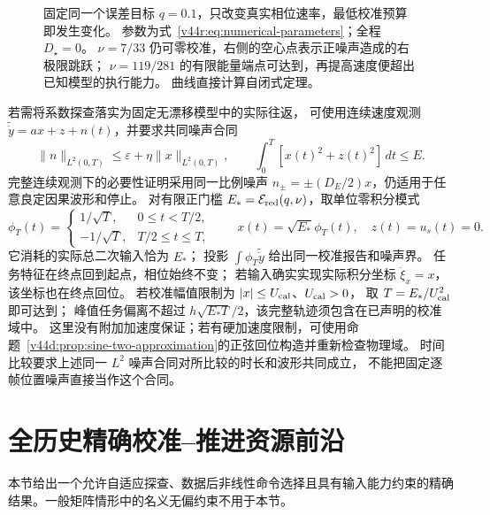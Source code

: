 \documentclass[11pt,a4paper]{article}
\numberwithin{equation}{section}
\theoremstyle{definition}
\begin{document}
\begin{figure}[htbp]
\caption{固定同一个误差目标 $q=0.1$，只改变真实相位速率，最低校准预算即发生变化。
参数为式~\eqref{v44r:eq:numerical-parameters}；全程 $D_\star=0$。
$\nu=7/33$ 仍可零校准，右侧的空心点表示正噪声造成的右极限跳跃；
$\nu=119/281$ 的有限能量端点可达到，再提高速度便超出已知模型的执行能力。
曲线直接计算自闭式定理。}
\label{fig:v44:redundant-frontier}
\end{figure}

若需将系数探查落实为固定无漂移模型中的实际往返，
可使用连续速度观测
$\widetilde{\dot y}=ax+z+n(t)$，并要求共同噪声合同
\[
 \|n\|_{L^2(0,T)}\le\varepsilon+\eta\|x\|_{L^2(0,T)},
 \qquad \int_0^T[x(t)^2+z(t)^2]\,dt\le E.
\]
完整连续观测下的必要性证明采用同一比例噪声
$n_\pm=\pm(D_E/2)x$，仍适用于任意良定因果波形和停止。
对有限正门槛 $E_*=\mathcal E_{\rm red}(q,\nu)$，取单位零积分模式
\[
 \phi_T(t)=
 \begin{cases}
 1/\sqrt T,&0\le t<T/2,\\
 -1/\sqrt T,&T/2\le t\le T,
 \end{cases}
 \qquad x(t)=\sqrt{E_*}\phi_T(t),\quad z(t)=u_s(t)=0.
\]
它消耗的实际总二次输入恰为 $E_*$；
投影 $\int\phi_T\widetilde{\dot y}$ 给出同一校准报告和噪声界。
任务特征在终点回到起点，相位始终不变；
若输入确实实现实际积分坐标 $\dot\xi_x=x$，该坐标也在终点回位。
若校准幅值限制为 $|x|\le U_{\rm cal}$、$U_{\rm cal}>0$，
取 $T=E_*/U_{\rm cal}^2$ 即可达到；
峰值任务偏离不超过 $h\sqrt{E_*T}/2$，该完整轨迹须包含在已声明的校准域中。
这里没有附加加速度保证；若有硬加速度限制，可使用命题~\ref{v44d:prop:sine-two-approximation}的正弦回位构造并重新检查物理域。
时间比较要求上述同一 $L^2$ 噪声合同对所比较的时长和波形共同成立，
不能把固定逐帧位置噪声直接当作这个合同。


\section{全历史精确校准--推进资源前沿}
\label{sec:v44:scalar-frontier}

本节给出一个允许自适应探查、数据后非线性命令选择且具有输入能力约束的精确结果。一般矩阵情形中的名义无偏约束不用于本节。
\end{document}
